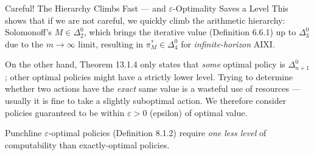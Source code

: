 \documentclass[aspectratio=169,10pt]{beamer}
\begin{document}
\begin{frame}{Careful! The Hierarchy Climbs Fast --- and $\varepsilon$-Optimality Saves a Level}
  This shows that if we are not careful, we quickly climb the arithmetic
  hierarchy: Solomonoff's $M\in\Delta_2^0$, which brings the iterative value
  (Definition 6.6.1) up to $\Delta_3^0$ due to the $m\to\infty$ limit,
  resulting in $\pi_M^*\in\Delta_4^0$ for \emph{infinite-horizon} AIXI.

  \bigskip
  On the other hand, Theorem 13.1.4 only states that \emph{some} optimal
  policy is $\Delta_{n+1}^0$; other optimal policies might have a strictly
  lower level. Trying to determine whether two actions have the
  \emph{exact} same value is a wasteful use of resources --- usually it is
  fine to take a slightly suboptimal action. We therefore consider policies
  guaranteed to be within $\varepsilon>0$ (epsilon) of optimal value.

  \begin{block}{Punchline}
    $\varepsilon$-optimal policies (Definition 8.1.2) require \emph{one less
    level} of computability than exactly-optimal policies.
  \end{block}
\end{frame}
\end{document}
